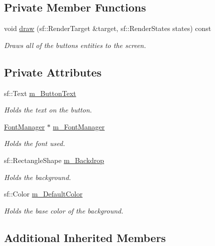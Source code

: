 \subsection*{Private Member Functions}
\begin{DoxyCompactItemize}
\item 
void \hyperlink{class_button_a13280eb9f2786fd2597fd3b9c9c5c858}{draw} (sf\+::\+Render\+Target \&target, sf\+::\+Render\+States states) const
\begin{DoxyCompactList}\small\item\em Draws all of the button\textquotesingle{}s entities to the screen. \end{DoxyCompactList}\end{DoxyCompactItemize}
\subsection*{Private Attributes}
\begin{DoxyCompactItemize}
\item 
sf\+::\+Text \hyperlink{class_button_ae0d027f107671be7d1d46f7963773c69}{m\+\_\+\+Button\+Text}
\begin{DoxyCompactList}\small\item\em Holds the text on the button. \end{DoxyCompactList}\item 
\hyperlink{class_font_manager}{Font\+Manager} $\ast$ \hyperlink{class_button_a65bbfab1d336ca64f5d32baca218139c}{m\+\_\+\+Font\+Manager}
\begin{DoxyCompactList}\small\item\em Holds the font used. \end{DoxyCompactList}\item 
sf\+::\+Rectangle\+Shape \hyperlink{class_button_a0fc282280a38c36feb2c3e74a9a5b492}{m\+\_\+\+Backdrop}
\begin{DoxyCompactList}\small\item\em Holds the background. \end{DoxyCompactList}\item 
sf\+::\+Color \hyperlink{class_button_af036d6f063c8e9044c8378c9ad51d593}{m\+\_\+\+Default\+Color}
\begin{DoxyCompactList}\small\item\em Holds the base color of the background. \end{DoxyCompactList}\end{DoxyCompactItemize}
\subsection*{Additional Inherited Members}


